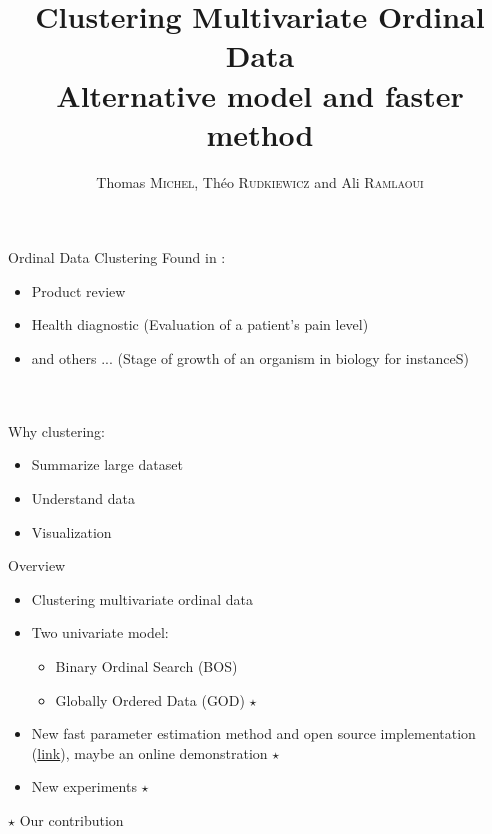 \documentclass{beamer}
\author[]{Thomas \textsc{Michel}, Théo \textsc{Rudkiewicz} and Ali \textsc{Ramlaoui}}
\title[Clustering Multivariate Ordinal Data]{Clustering Multivariate Ordinal Data\\Alternative model and faster method}
\begin{document}
\frame{\titlepage}

\begin{frame}{Ordinal Data Clustering}
Found in :
\begin{itemize}
    \item Product review
    \item Health diagnostic (Evaluation of a patient's pain level)
    \item and others ... (Stage of growth of an organism in biology for instanceS)
\end{itemize}\\~\\

Why clustering:
\begin{itemize}
    \item Summarize large dataset
    \item Understand data
    \item Visualization
\end{itemize}
    
\end{frame}

\begin{frame}{Overview}
    \begin{itemize}
        \item Clustering multivariate ordinal data
        \item Two univariate model: \begin{itemize}
                  \item Binary Ordinal Search (BOS)
                  \item Globally Ordered Data (GOD) $\star$
              \end{itemize}
        \item New fast parameter estimation method and open source implementation (\hyperlink{https://github.com/Thomick/Ordinal-data-clustering}{link}), maybe an online demonstration $\star$
        \item New experiments $\star$
    \end{itemize}

    \hfill\small $\star$ Our contribution
\end{frame}
\end{document}

